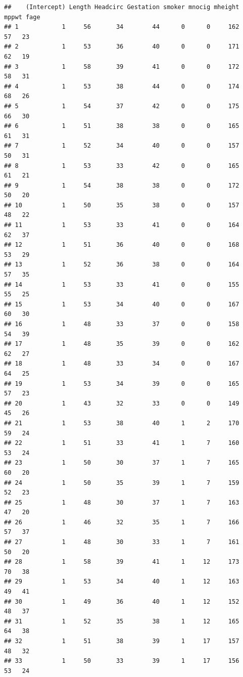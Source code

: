 \documentclass[
]{book}
\begin{document}
\begin{verbatim}
##    (Intercept) Length Headcirc Gestation smoker mnocig mheight mppwt fage
## 1            1     56       34        44      0      0     162    57   23
## 2            1     53       36        40      0      0     171    62   19
## 3            1     58       39        41      0      0     172    58   31
## 4            1     53       38        44      0      0     174    68   26
## 5            1     54       37        42      0      0     175    66   30
## 6            1     51       38        38      0      0     165    61   31
## 7            1     52       34        40      0      0     157    50   31
## 8            1     53       33        42      0      0     165    61   21
## 9            1     54       38        38      0      0     172    50   20
## 10           1     50       35        38      0      0     157    48   22
## 11           1     53       33        41      0      0     164    62   37
## 12           1     51       36        40      0      0     168    53   29
## 13           1     52       36        38      0      0     164    57   35
## 14           1     53       33        41      0      0     155    55   25
## 15           1     53       34        40      0      0     167    60   30
## 16           1     48       33        37      0      0     158    54   39
## 17           1     48       35        39      0      0     162    62   27
## 18           1     48       33        34      0      0     167    64   25
## 19           1     53       34        39      0      0     165    57   23
## 20           1     43       32        33      0      0     149    45   26
## 21           1     53       38        40      1      2     170    59   24
## 22           1     51       33        41      1      7     160    53   24
## 23           1     50       30        37      1      7     165    60   20
## 24           1     50       35        39      1      7     159    52   23
## 25           1     48       30        37      1      7     163    47   20
## 26           1     46       32        35      1      7     166    57   37
## 27           1     48       30        33      1      7     161    50   20
## 28           1     58       39        41      1     12     173    70   38
## 29           1     53       34        40      1     12     163    49   41
## 30           1     49       36        40      1     12     152    48   37
## 31           1     52       35        38      1     12     165    64   38
## 32           1     51       38        39      1     17     157    48   32
## 33           1     50       33        39      1     17     156    53   24

\end{verbatim}
\end{document}
